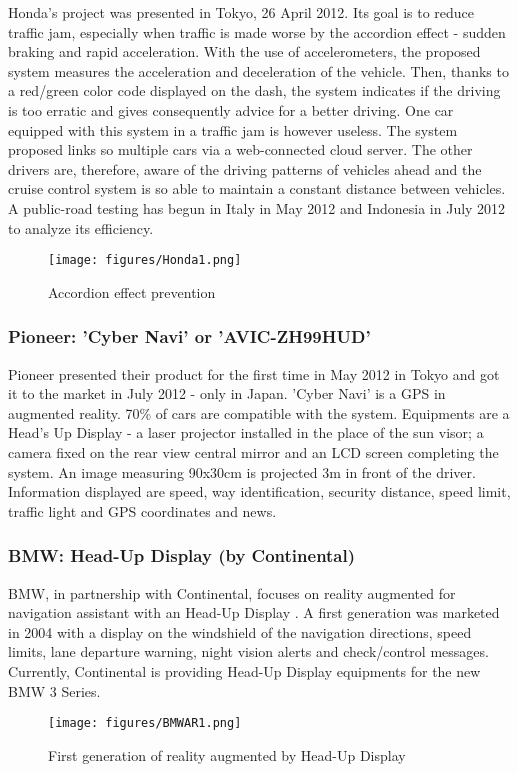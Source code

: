 \documentclass[a4paper]{article}
\begin{document}
Honda's project \cite{HondaTraffic} was presented in Tokyo, 26 April 2012. Its goal is to reduce traffic jam, especially when traffic is made worse by the accordion effect - sudden braking and rapid acceleration. With the use of accelerometers, the proposed system measures the acceleration and deceleration of the vehicle. Then, thanks to a red/green color code displayed on the dash, the system indicates if the driving is too erratic and gives consequently advice for a better driving. One car equipped with this system in a traffic jam is however useless. The system proposed links so multiple cars via a web-connected cloud server. The other drivers are, therefore, aware of the driving patterns of vehicles ahead and the cruise control system is so able to maintain a constant distance between vehicles. A public-road testing has begun in Italy in May 2012 and Indonesia in July 2012 to analyze its efficiency.
\begin{figure}[!htb]
\begin{center}
\texttt{[image: figures/Honda1.png]}
\caption{Accordion effect prevention}
\end{center}
\end{figure}

\subsubsection{Pioneer: 'Cyber Navi' or 'AVIC-ZH99HUD'}

Pioneer presented their product \cite{Pioneer} for the first time in May 2012 in Tokyo and got it to the market in July 2012 - only in Japan. 'Cyber Navi' is a GPS in augmented reality. 70\% of cars are compatible with the system. Equipments are a Head's Up Display - a laser projector installed in the place of the sun visor; a camera fixed on the rear view central mirror and an LCD screen completing the system. An image measuring 90x30cm is projected 3m in front of the driver. Information displayed are speed, way identification, security distance, speed limit, traffic light and GPS coordinates and news. 

\subsubsection{BMW: Head-Up Display (by Continental)}
\label{BMWAR}

BMW, in partnership with Continental, focuses on reality augmented for navigation assistant with an Head-Up Display \cite{BMWHUD}. A first generation was marketed in 2004 with a display on the windshield of the navigation directions, speed limits, lane departure warning, night vision alerts and check/control messages. Currently, Continental is providing Head-Up Display equipments for the new BMW 3 Series.
\begin{figure}[ht!]
\begin{center}
\texttt{[image: figures/BMWAR1.png]}
\caption{First generation of reality augmented by Head-Up Display}
\end{center}
\end{figure}
\end{document}
